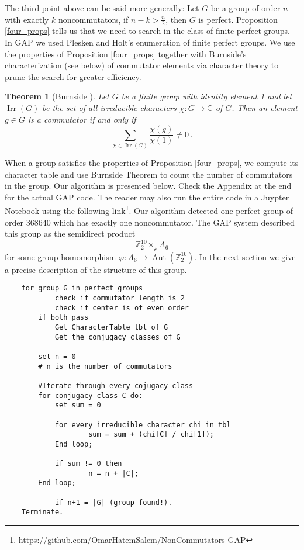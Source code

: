 \documentclass[11pt,twoside]{amsart}
\DeclareMathOperator{\Aut}{Aut}
\newcommand{\Z}{\mathbb{Z}}
\newtheorem{thm}{Theorem}[section]
\numberwithin{equation}{section}
\begin{document}
The third point above can be said more generally: Let $G$ be a group of order $n$ with exactly $k$ noncommutators, if $n-k>\frac{n}{2}$, then $G$ is perfect.  Proposition \ref{four_props} tells us that we need to search in the class of finite perfect groups. In GAP we used Plesken and Holt's enumeration of finite perfect groups. We use the properties of Proposition \ref{four_props} together with Burnside's characterization (see below) of commutator elements via character theory to prune the search for greater efficiency. 

\begin{thm}[Burnside \cite{burnsidecomm}]
Let $G$ be a finite group with identity element 1 and let $\operatorname{Irr}(G)$ be the set of all irreducible characters $\chi:G\to \mathbb{C}$ of $G$. Then an element $g\in G$ is a commutator if and only if 
\[
    \sum_{\chi \in \operatorname{Irr}(G)} \frac{\chi(g)}{\chi(1)} \neq 0\,.
    \label{comm_criterion}
\]
\end{thm}

When a group satisfies the properties of Proposition \ref{four_props}, we compute its character table and use Burnside Theorem to count the number of commutators in the group. Our algorithm is presented below. Check the Appendix at the end for the actual GAP code. The reader may also run the entire code in a Juypter Notebook using the following \href{https://github.com/OmarHatemSalem/NonCommutators-GAP}{link}\footnote{https://github.com/OmarHatemSalem/NonCommutators-GAP}. Our algorithm detected one perfect group of order $368640$ which has exactly one noncommutator. The GAP system described this group as the semidirect product \[\mathbb{Z}_2^{10} \rtimes_\varphi A_6\] for some group homomorphism $\varphi:A_6\to \Aut(\Z_2^{10})$. In the next section we give a precise description of the structure of this group.

\begin{tcolorbox}[colback=white, colframe=black!60, title=Pseudocode for the search algorithm]
    \begin{verbatim}
    for group G in perfect groups
            check if commutator length is 2
            check if center is of even order
        if both pass 
            Get CharacterTable tbl of G 
            Get the conjugacy classes of G

        set n = 0
        # n is the number of commutators
                
        #Iterate through every cojugacy class
        for conjugacy class C do:
            set sum = 0
            
            for every irreducible character chi in tbl
                    sum = sum + (chi[C] / chi[1]);
            End loop;

            if sum != 0 then
                    n = n + |C|;
        End loop;
                
            if n+1 = |G| (group found!). 
    Terminate.
    \end{verbatim} \label{alg_for_search}
\end{tcolorbox}
\end{document}
